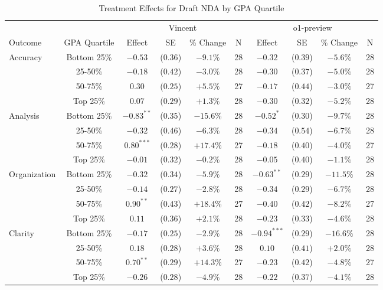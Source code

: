\begin{table}[!htbp]
\centering
\caption{Treatment Effects for Draft NDA by GPA Quartile}
\label{tab:task4_gpa}
\begin{tabular}{lccccccccc}
\hline\hline
& & \multicolumn{4}{c}{Vincent} & \multicolumn{4}{c}{o1-preview} \\
\cline{3-10}
Outcome & GPA Quartile & Effect & SE & \% Change & N & Effect & SE & \% Change & N \\
\hline
\multirow{4}{*}{Accuracy} & Bottom 25\% & $-0.53$ & ($0.36$) & $-9.1\%$ & 28 & $-0.32$ & ($0.39$) & $-5.6\%$ & 28 \\
& 25-50\% & $-0.18$ & ($0.42$) & $-3.0\%$ & 28 & $-0.30$ & ($0.37$) & $-5.0\%$ & 28 \\
& 50-75\% & $0.30$ & ($0.25$) & $+5.5\%$ & 27 & $-0.17$ & ($0.44$) & $-3.0\%$ & 27 \\
& Top 25\% & $0.07$ & ($0.29$) & $+1.3\%$ & 28 & $-0.30$ & ($0.32$) & $-5.2\%$ & 28 \\
\hline
\multirow{4}{*}{Analysis} & Bottom 25\% & $-0.83^{**}$ & ($0.35$) & $-15.6\%$ & 28 & $-0.52^{*}$ & ($0.30$) & $-9.7\%$ & 28 \\
& 25-50\% & $-0.32$ & ($0.46$) & $-6.3\%$ & 28 & $-0.34$ & ($0.54$) & $-6.7\%$ & 28 \\
& 50-75\% & $0.80^{***}$ & ($0.28$) & $+17.4\%$ & 27 & $-0.18$ & ($0.40$) & $-4.0\%$ & 27 \\
& Top 25\% & $-0.01$ & ($0.32$) & $-0.2\%$ & 28 & $-0.05$ & ($0.40$) & $-1.1\%$ & 28 \\
\hline
\multirow{4}{*}{Organization} & Bottom 25\% & $-0.32$ & ($0.34$) & $-5.9\%$ & 28 & $-0.63^{**}$ & ($0.29$) & $-11.5\%$ & 28 \\
& 25-50\% & $-0.14$ & ($0.27$) & $-2.8\%$ & 28 & $-0.34$ & ($0.29$) & $-6.7\%$ & 28 \\
& 50-75\% & $0.90^{**}$ & ($0.43$) & $+18.4\%$ & 27 & $-0.40$ & ($0.42$) & $-8.2\%$ & 27 \\
& Top 25\% & $0.11$ & ($0.36$) & $+2.1\%$ & 28 & $-0.23$ & ($0.33$) & $-4.6\%$ & 28 \\
\hline
\multirow{4}{*}{Clarity} & Bottom 25\% & $-0.17$ & ($0.25$) & $-2.9\%$ & 28 & $-0.94^{***}$ & ($0.29$) & $-16.6\%$ & 28 \\
& 25-50\% & $0.18$ & ($0.28$) & $+3.6\%$ & 28 & $0.10$ & ($0.41$) & $+2.0\%$ & 28 \\
& 50-75\% & $0.70^{**}$ & ($0.29$) & $+14.3\%$ & 27 & $-0.23$ & ($0.42$) & $-4.8\%$ & 27 \\
& Top 25\% & $-0.26$ & ($0.28$) & $-4.9\%$ & 28 & $-0.22$ & ($0.37$) & $-4.1\%$ & 28 \\

\end{tabular}
\end{table}

